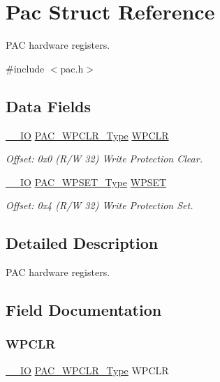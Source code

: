 \hypertarget{struct_pac}{}\section{Pac Struct Reference}
\label{struct_pac}


P\+AC hardware registers.  




{\ttfamily \#include $<$pac.\+h$>$}

\subsection*{Data Fields}
\begin{DoxyCompactItemize}
\item 
\mbox{\hyperlink{core__cm0plus_8h_aec43007d9998a0a0e01faede4133d6be}{\+\_\+\+\_\+\+IO}} \mbox{\hyperlink{union_p_a_c___w_p_c_l_r___type}{P\+A\+C\+\_\+\+W\+P\+C\+L\+R\+\_\+\+Type}} \mbox{\hyperlink{struct_pac_af8a4323b081487e0339fe325489a3bba}{W\+P\+C\+LR}}
\begin{DoxyCompactList}\small\item\em Offset\+: 0x0 (R/W 32) Write Protection Clear. \end{DoxyCompactList}\item 
\mbox{\hyperlink{core__cm0plus_8h_aec43007d9998a0a0e01faede4133d6be}{\+\_\+\+\_\+\+IO}} \mbox{\hyperlink{union_p_a_c___w_p_s_e_t___type}{P\+A\+C\+\_\+\+W\+P\+S\+E\+T\+\_\+\+Type}} \mbox{\hyperlink{struct_pac_a6c7726505b7c3dc8aa8f09e9ba0e4be0}{W\+P\+S\+ET}}
\begin{DoxyCompactList}\small\item\em Offset\+: 0x4 (R/W 32) Write Protection Set. \end{DoxyCompactList}\end{DoxyCompactItemize}


\subsection{Detailed Description}
P\+AC hardware registers. 

\subsection{Field Documentation}
\mbox{\label{struct_pac_af8a4323b081487e0339fe325489a3bba}} 
\subsubsection{\texorpdfstring{WPCLR}{WPCLR}}
{\footnotesize\ttfamily \mbox{\hyperlink{core__cm0plus_8h_aec43007d9998a0a0e01faede4133d6be}{\+\_\+\+\_\+\+IO}} \mbox{\hyperlink{union_p_a_c___w_p_c_l_r___type}{P\+A\+C\+\_\+\+W\+P\+C\+L\+R\+\_\+\+Type}} W\+P\+C\+LR}




